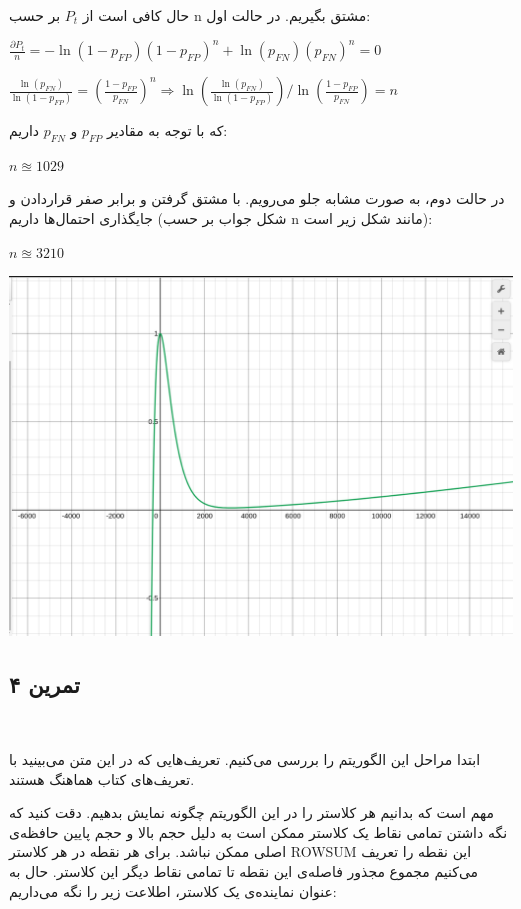 \documentclass[a4paper,12pt]{article}
\newcounter{subproblemcounter}
\newcommand{\problem}[1]
{
	\subsection*{
		تمرین
		#1
		}
	\setcounter{subproblemcounter}{1}
}
\begin{document}
حال کافی است از
$P_t$
بر حسب 
n 
مشتق بگیریم. در حالت اول:
\begin{LTR}
	$\frac{\partial P_t}{n} = - \ln (1-p_{FP})(1-p_{FP})^n + \ln(p_{FN})(p_{FN})^n = 0$

	$\frac{\ln(p_{FN})}{\ln({1-p_{FP}})} = (\frac{1-p_{FP}}{p_{FN}})^n \Rightarrow 
	\ln(\frac{\ln(p_{FN})}{\ln({1-p_{FP}})} ) / \ln(\frac{1-p_{FP}}{p_{FN}}) = n$
\end{LTR}

که با توجه به مقادیر 
$p_{FP}$
و
$p_{FN}$
داریم: 
\begin{LTR}
$n \approxeq 1029$
\end{LTR}
 
در حالت دوم، به صورت مشابه جلو می‌رویم. با مشتق گرفتن و برابر صفر قراردادن و جایگذاری احتمال‌ها داریم (شکل جواب بر حسب 
n
مانند شکل زیر است):
\begin{LTR}
$n \approxeq 3210$
\end{LTR}

\includegraphics[scale=0.4]{p2.png}




\problem{۴}
\ 

ابتدا مراحل این الگوریتم را بررسی می‌کنیم. تعریف‌هایی که در این متن می‌بینید با تعریف‌های کتاب هماهنگ هستند. 

مهم است که بدانیم هر کلاستر را در این الگوریتم چگونه نمایش بدهیم. دقت کنید که نگه داشتن تمامی نقاط یک کلاستر ممکن است به دلیل حجم بالا و حجم پایین حافظه‌ی اصلی ممکن 
نباشد. برای هر نقطه در هر کلاستر
ROWSUM
این نقطه را تعریف می‌کنیم مجموع مجذور فاصله‌ی این نقطه تا تمامی نقاط دیگر این کلاستر. حال به عنوان نماینده‌ی یک کلاستر، اطلاعت زیر را نگه می‌داریم: 
\end{document}
